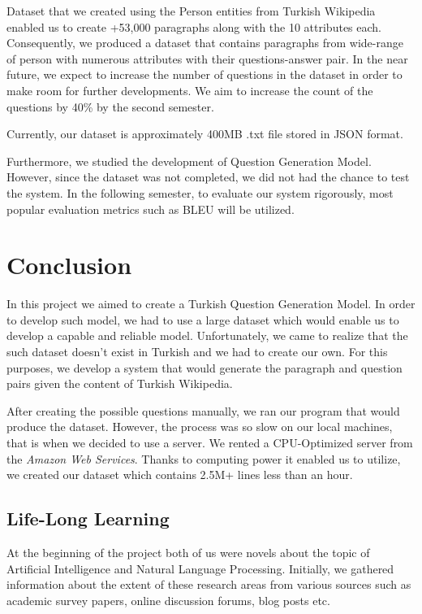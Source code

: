 \documentclass{mefsdp}
\begin{document}
	Dataset that we created using the Person entities from Turkish Wikipedia enabled us to create +53,000 paragraphs along with the 10 attributes each. Consequently, we produced a dataset that contains paragraphs from wide-range of person with numerous attributes with their questions-answer pair. In the near future, we expect to increase the number of questions in the dataset in order to make room for further developments. We aim to increase the count of the questions by 40\% by the second semester. \newline \par
	
	Currently, our dataset is approximately 400MB .txt file stored in JSON format.\newline \par
	
	Furthermore, we studied the development of Question Generation Model. However, since the dataset was not completed, we did not had the chance to test the system. In the following semester, to evaluate our system rigorously, most popular evaluation metrics such as BLEU will be utilized.
	\newline \par
	
	
	\section{Conclusion}
	In this project we aimed to create a Turkish Question Generation Model. In order to develop such model, we had to use a large dataset which would enable us to develop a capable and reliable model. Unfortunately, we came to realize that the such dataset doesn't exist in Turkish and we had to create our own. For this purposes, we develop a system that would generate the paragraph and question pairs given the content of Turkish Wikipedia. \newline \par
	
	After creating the possible questions manually, we ran our program that would produce the dataset. However, the process was so slow on our local machines, that is when we decided to use a server. We rented a CPU-Optimized server from the \textit{Amazon Web Services}. Thanks to computing power it enabled us to utilize, we created our dataset which contains 2.5M+ lines less than an hour. \newline \par
 
	
	\subsection{Life-Long Learning}
	At the beginning of the project both of us were novels about the topic of Artificial Intelligence and Natural Language Processing. Initially, we gathered information about the extent of these research areas from various sources such as academic survey papers, online discussion forums, blog posts etc. \newline \par
	
\end{document}
